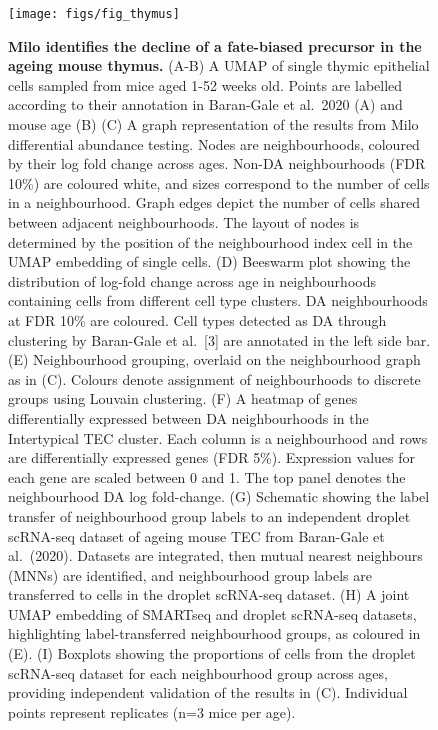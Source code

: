 \documentclass[
  10pt,
]{article}
\begin{document}
\begin{figure}[ht]
\texttt{[image: figs/fig\_thymus]} \caption{\textbf{Milo identifies the decline of a fate-biased precursor in the ageing mouse thymus.}
(A-B) A UMAP of single thymic epithelial cells sampled from mice aged 1-52 weeks old. Points are labelled according to their annotation in Baran-Gale et al.~2020 (A) and mouse age (B)
(C) A graph representation of the results from Milo differential abundance testing. Nodes are neighbourhoods, coloured by their log fold change across ages. Non-DA neighbourhoods (FDR 10\%) are coloured white, and sizes correspond to the number of cells in a neighbourhood. Graph edges depict the number of cells shared between adjacent neighbourhoods. The layout of nodes is determined by the position of the neighbourhood index cell in the UMAP embedding of single cells.
(D) Beeswarm plot showing the distribution of log-fold change across age in neighbourhoods containing cells from different cell type clusters. DA neighbourhoods at FDR 10\% are coloured. Cell types detected as DA through clustering by Baran-Gale et al.~{[}3{]} are annotated in the left side bar.
(E) Neighbourhood grouping, overlaid on the neighbourhood graph as in (C). Colours denote assignment of neighbourhoods to discrete groups using Louvain clustering.
(F) A heatmap of genes differentially expressed between DA neighbourhoods in the Intertypical TEC cluster. Each column is a neighbourhood and rows are differentially expressed genes (FDR 5\%). Expression values for each gene are scaled between 0 and 1. The top panel denotes the neighbourhood DA log fold-change.
(G) Schematic showing the label transfer of neighbourhood group labels to an independent droplet scRNA-seq dataset of ageing mouse TEC from Baran-Gale et al.~(2020). Datasets are integrated, then mutual nearest neighbours (MNNs) are identified, and neighbourhood group labels are transferred to cells in the droplet scRNA-seq dataset.
(H) A joint UMAP embedding of SMARTseq and droplet scRNA-seq datasets, highlighting label-transferred neighbourhood groups, as coloured in (E).
(I) Boxplots showing the proportions of cells from the droplet scRNA-seq dataset for each neighbourhood group across ages, providing independent validation of the results in (C). Individual points represent replicates (n=3 mice per age).}\label{fig:fig-4}
\end{figure}
\end{document}
